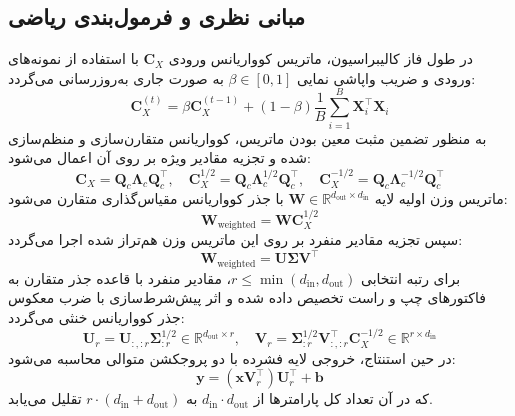 \subsection{مبانی نظری و فرمول‌بندی ریاضی}
در طول فاز کالیبراسیون، ماتریس کوواریانس ورودی $\mathbf{C}_X$ با استفاده از نمونه‌های ورودی و ضریب واپاشی نمایی $\beta \in [0, 1]$ به صورت جاری به‌روزرسانی می‌گردد:
\begin{equation}
\mathbf{C}_X^{(t)} = \beta \mathbf{C}_X^{(t-1)} + (1 - \beta) \frac{1}{B} \sum_{i=1}^B \mathbf{X}_i^\top \mathbf{X}_i
\end{equation}
به منظور تضمین مثبت معین بودن ماتریس، کوواریانس متقارن‌سازی و منظم‌سازی شده و تجزیه مقادیر ویژه بر روی آن اعمال می‌شود:
\begin{equation}
\mathbf{C}_X = \mathbf{Q}_c \mathbf{\Lambda}_c \mathbf{Q}_c^\top, \quad \mathbf{C}_X^{1/2} = \mathbf{Q}_c \mathbf{\Lambda}_c^{1/2} \mathbf{Q}_c^\top, \quad \mathbf{C}_X^{-1/2} = \mathbf{Q}_c \mathbf{\Lambda}_c^{-1/2} \mathbf{Q}_c^\top
\end{equation}
ماتریس وزن اولیه لایه $\mathbf{W} \in \mathbb{R}^{d_{\text{out}} \times d_{\text{in}}}$ با جذر کوواریانس مقیاس‌گذاری متقارن می‌شود:
\begin{equation}
\mathbf{W}_{\text{weighted}} = \mathbf{W} \mathbf{C}_X^{1/2}
\end{equation}
سپس تجزیه مقادیر منفرد بر روی این ماتریس وزن هم‌تراز شده اجرا می‌گردد:
\begin{equation}
\mathbf{W}_{\text{weighted}} = \mathbf{U} \mathbf{\Sigma} \mathbf{V}^\top
\end{equation}
برای رتبه انتخابی $r \le \min(d_{\text{in}}, d_{\text{out}})$، مقادیر منفرد با قاعده جذر متقارن به فاکتورهای چپ و راست تخصیص داده شده و اثر پیش‌شرط‌سازی با ضرب معکوس جذر کوواریانس خنثی می‌گردد:
\begin{equation}
\mathbf{U}_r = \mathbf{U}_{:, :r} \mathbf{\Sigma}_{:r}^{1/2} \in \mathbb{R}^{d_{\text{out}} \times r}, \quad \mathbf{V}_r = \mathbf{\Sigma}_{:r}^{1/2} \mathbf{V}_{:, :r}^\top \mathbf{C}_X^{-1/2} \in \mathbb{R}^{r \times d_{\text{in}}}
\end{equation}
در حین استنتاج، خروجی لایه فشرده با دو پروجکشن متوالی محاسبه می‌شود:
\begin{equation}
\mathbf{y} = (\mathbf{x} \mathbf{V}_r^\top) \mathbf{U}_r^\top + \mathbf{b}
\end{equation}
که در آن تعداد کل پارامترها از $d_{\text{in}} \cdot d_{\text{out}}$ به $r \cdot (d_{\text{in}} + d_{\text{out}})$ تقلیل می‌یابد.

